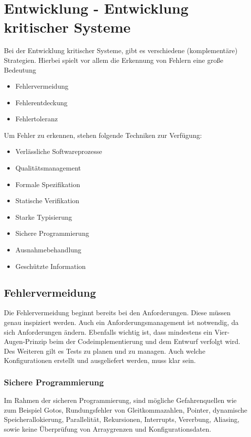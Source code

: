 \section{Entwicklung - Entwicklung kritischer Systeme}
Bei der Entwicklung kritischer Systeme, gibt es verschiedene (komplementäre) Strategien. Hierbei spielt vor allem die Erkennung von Fehlern eine große Bedeutung
\begin{itemize}
\item Fehlervermeidung
\item Fehlerentdeckung
\item Fehlertoleranz
\end{itemize}

Um Fehler zu erkennen, stehen folgende Techniken zur Verfügung:

\begin{itemize}
\item Verlässliche Softwareprozesse
\item Qualitätsmanagement
\item Formale Spezifikation
\item Statische Verifikation
\item Starke Typisierung
\item Sichere Programmierung
\item Ausnahmebehandlung
\item Geschützte Information
\end{itemize}

\subsection{Fehlervermeidung}
Die Fehlervermeidung beginnt bereits bei den Anforderungen. Diese müssen genau inspiziert werden. Auch ein Anforderungsmanagement ist notwendig, da sich Anforderungen ändern.
Ebenfalls wichtig ist, dass mindestens ein Vier-Augen-Prinzip beim der Codeimplementierung und dem Entwurf verfolgt wird. Des Weiteren gilt es Tests zu planen und zu managen. Auch welche Konfigurationen erstellt und ausgeliefert werden, muss klar sein.

\subsubsection{Sichere Programmierung}
Im Rahmen der sicheren Programmierung, sind mögliche Gefahrenquellen wie zum Beispiel Gotos, Rundungsfehler von Gleitkommazahlen, Pointer, dynamische Speicherallokierung, Parallelität, Rekursionen, Interrupts, Vererbung, Aliasing, sowie keine Überprüfung von Arraygrenzen und Konfigurationsdaten. 

